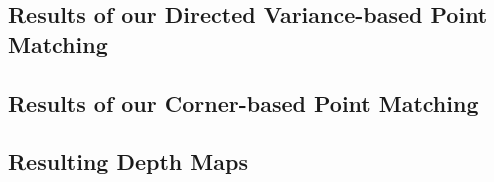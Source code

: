 \subsection{Results of our Directed Variance-based Point Matching}

\subsection{Results of our Corner-based Point Matching}

\subsection{Resulting Depth Maps}